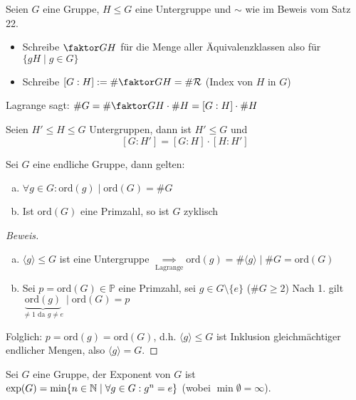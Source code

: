 \documentclass[a4paper]{report}
\begin{document}
\begin{nota*}
Seien $G$ eine Gruppe, $H \le G$ eine Untergruppe und $\sim$ wie im Beweis vom Satz 22.
\begin{itemize}
\item Schreibe $\faktor GH$ für die Menge aller Äquivalenzklassen also für $\{gH \mid g \in G\}$
\item Schreibe $[G : H]:= \#  \faktor GH = \# \mathcal R$ (Index von $H$ in $G$)
\end{itemize}
Lagrange sagt: $\#G = \# \faktor GH \cdot \#H = [G : H] \cdot \#H$
\end{nota*}

\begin{ubng}
Seien $H' \le H \le G$ Untergruppen, dann ist $H' \le G$ und
$$[G: H'] = [G:H]\cdot[H:H']$$
\end{ubng}

\begin{kor} %
  Sei $G$ eine endliche Gruppe, dann gelten:
  \begin{enumerate}[(a)]
    \item $\forall g \in G : \mathrm{ord}(g) \mid \mathrm{ord}(G) = \#G$
    \item Ist $\mathrm{ord}(G)$ eine Primzahl, so ist $G$ zyklisch
  \end{enumerate}
  \begin{proof}[Beweis] \item
    \begin{enumerate}[(a)]
\item $\langle g \rangle \le G$ ist eine Untergruppe $\underset{\text{Lagrange}}\implies \mathrm{ord}(g) = \#\langle g \rangle \mid \#G = \mathrm{ord}(G)$
\item Sei $p = \mathrm{ord}(G) \in \mathbb P$ eine Primzahl, sei $g \in G \setminus \{e\}$ ($\#G \ge 2$)
Nach 1. gilt $\underbrace{\mathrm{ord}(g)}_{\neq 1 \text{ da } g \neq e} \mid \mathrm{ord}(G) = p$
    \end{enumerate}
Folglich: $p = \mathrm{ord}(g) = \mathrm{ord}(G)$, d.h. $\langle g \rangle \le G$ ist Inklusion gleichmächtiger endlicher Mengen, also $\langle g \rangle = G.$
\end{proof}
\end{kor}

\begin{defi}
Sei $G$ eine Gruppe, der Exponent von $G$ ist $\exp(G) = \min \{n \in \Bbb N \mid \forall g \in G : g^{n} = e\}$ (wobei $\min \emptyset = \infty$).
\end{defi}
\end{document}
